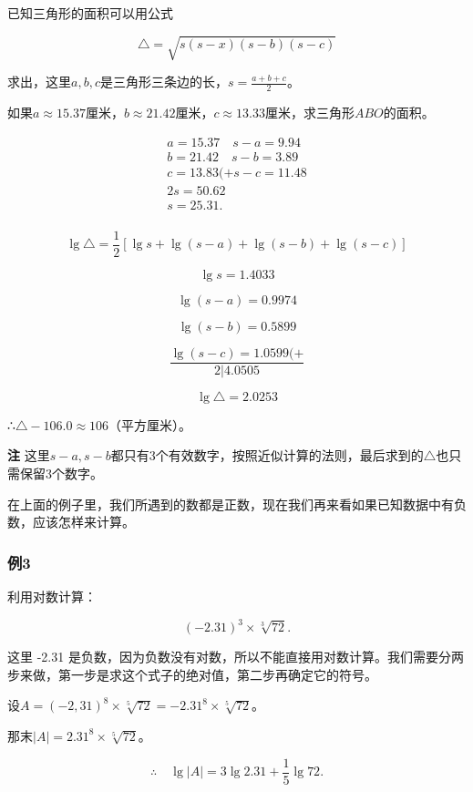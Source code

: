 已知三角形的面积可以用公式

\[
\triangle = \sqrt{s (s - x) (s - b) (s - c)}
\]

求出，这里\(a, b, c\)是三角形三条边的长，\(s = \frac{a + b + c}{2}\)。

如果\(a \approx 15.37\)厘米，\(b \approx 21.42\)厘米，\(c \approx 13.33\)厘米，求三角形\(ABO\)的面积。


\[
\begin{array}{l} a = 15.37 \quad s - a = 9.94 \\ b = 21.42 \quad s - b = 3.89 \\ c = 13.83 (+ s - c = 11.48 \\ 2 s = 50.62 \\ s = 25.31. \\ \end{array}
\]

\[
\lg \triangle = \frac{1}{2} [ \lg s + \lg (s - a) + \lg (s - b) + \lg (s - c) ]
\]

\[
\lg s = 1.4033
\]

\[
\lg (s - a) = 0.9974
\]

\[
\lg (s - b) = 0.5899
\]

\[
\frac{\lg (s - c) = 1.0599 (+}{2 | 4.0505}
\]

\[
\lg \triangle = 2.0253
\]

∴\(\triangle-106.0\approx106\)（平方厘米）。

\textbf{注}
这里\(s - a, s - b\)都只有3个有效数字，按照近似计算的法则，最后求到的\(\triangle\)也只需保留3个数字。

在上面的例子里，我们所遇到的数都是正数，现在我们再来看如果已知数据中有负数，应该怎样来计算。

\subsubsection{例3}

利用对数计算：

\[
(- 2.31)^{3} \times \sqrt[3]{72}.
\]

 这里 -2.31
是负数，因为负数没有对数，所以不能直接用对数计算。我们需要分两步来做，第一步是求这个式子的绝对值，第二步再确定它的符号。

设\(A = (-2,31)^{8} \times \sqrt[5]{72} = -2.31^{8} \times \sqrt[5]{72}\)。

那末\(|A| = 2.31^{8} \times \sqrt[5]{72}\)。

\[
\therefore \quad \lg | A | = 3 \lg 2.31 + \frac{1}{5} \lg 72.
\]

